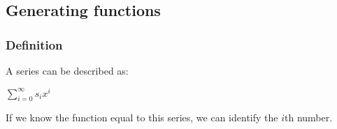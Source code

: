 \subsection{Generating functions}

\subsubsection{Definition}

A series can be described as:

$\sum_{i=0}^{\infty }s_i x^i$

If we know the function equal to this series, we can identify the \(i\)th number.

